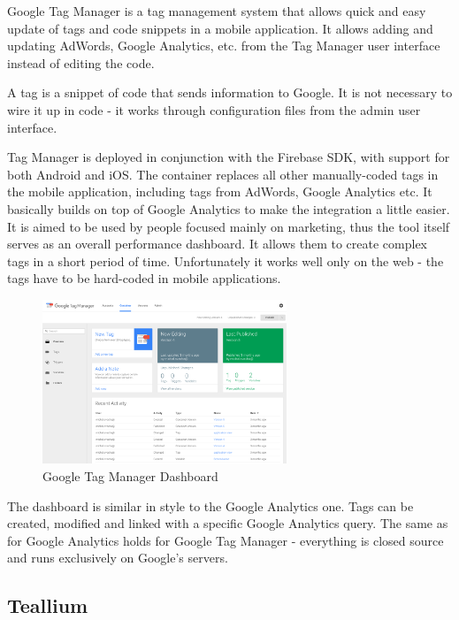 Google Tag Manager is a tag management system that allows quick and easy update of tags and code snippets in a mobile application. It allows adding and updating AdWords, Google Analytics, etc. from the Tag Manager user interface instead of editing the code.

A tag is a snippet of code that sends information to Google. It is not necessary to wire it up in code - it works through configuration files from the admin user interface.

Tag Manager is deployed in conjunction with the Firebase SDK, with support for both Android and iOS. The container replaces all other manually-coded tags in the mobile application, including tags from AdWords, Google Analytics etc. It basically builds on top of Google Analytics to make the integration a little easier. It is aimed to be used by people focused mainly on marketing, thus the tool itself serves as an overall performance dashboard. It allows them to create complex tags in a short period of time. Unfortunately it works well only on the web - the tags have to be hard-coded in mobile applications.

\newpage

\begin{figure}[!ht]
	\centering
	\includegraphics[width=0.65\textwidth]{figures/tagmanager}
    \caption{Google Tag Manager Dashboard}
\end{figure}

The dashboard is similar in style to the Google Analytics one. Tags can be created, modified and linked with a specific Google Analytics query. The same as for Google Analytics holds for Google Tag Manager - everything is closed source and runs exclusively on Google's servers.

\subsection{Teallium}

